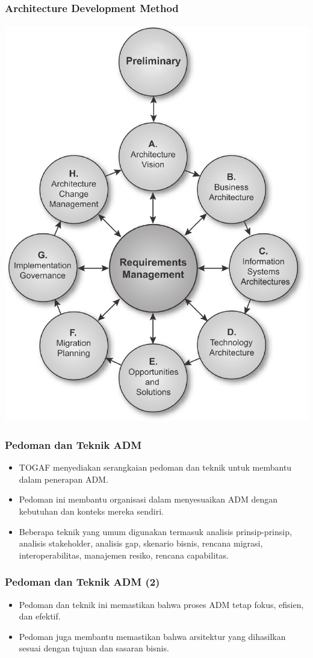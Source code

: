 \documentclass[aspectratio=169, table]{beamer}
\begin{document}
	{
		\begin{frame}
			\frametitle{Architecture Development Method}
			\framesubtitle{\hspace{1cm}}
			\begin{center}
				\includegraphics[width=.43\textwidth]{../figures/architecture_development_method}
			\end{center}
		\end{frame}
	}

	\begin{frame}
		\frametitle{Pedoman dan Teknik ADM}
		\begin{itemize}
			\item TOGAF menyediakan serangkaian pedoman dan teknik untuk membantu dalam penerapan ADM.
			\item Pedoman ini membantu organisasi dalam menyesuaikan ADM dengan kebutuhan dan konteks mereka sendiri.
			\item Beberapa teknik yang umum digunakan termasuk analisis prinsip-prinsip, analisis stakeholder, analisis gap, skenario bisnis, rencana migrasi, interoperabilitas, manajemen resiko, rencana capabilitas.
		\end{itemize}
	\end{frame}

	\begin{frame}
		\frametitle{Pedoman dan Teknik ADM (2)}
		\begin{itemize}
			\item Pedoman dan teknik ini memastikan bahwa proses ADM tetap fokus, efisien, dan efektif.
			\item Pedoman juga membantu memastikan bahwa arsitektur yang dihasilkan sesuai dengan tujuan dan sasaran bisnis.
		\end{itemize}
	\end{frame}
\end{document}
